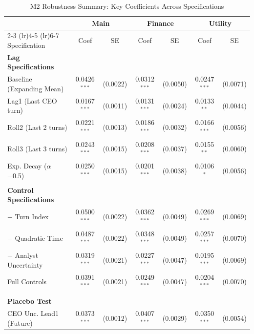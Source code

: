 \documentclass[11pt]{article}
\begin{document}
\newpage

\begin{table}[htbp]
\centering
\caption{M2 Robustness Summary: Key Coefficients Across Specifications}
\label{tab:robustness_summary}
\footnotesize
\setlength{\tabcolsep}{4pt}
\begin{tabular}{lcccccc}
\toprule
 & \multicolumn{2}{c}{Main} & \multicolumn{2}{c}{Finance} & \multicolumn{2}{c}{Utility} \\
\cmidrule(lr){2-3} \cmidrule(lr){4-5} \cmidrule(lr){6-7}
Specification & Coef & SE & Coef & SE & Coef & SE \\
\midrule
\textbf{Lag Specifications} \\
Baseline (Expanding Mean) & 0.0426$^{***}$ & (0.0022) & 0.0312$^{***}$ & (0.0050) & 0.0247$^{***}$ & (0.0071) \\
Lag1 (Last CEO turn) & 0.0167$^{***}$ & (0.0011) & 0.0131$^{***}$ & (0.0024) & 0.0133$^{**}$ & (0.0044) \\
Roll2 (Last 2 turns) & 0.0221$^{***}$ & (0.0013) & 0.0186$^{***}$ & (0.0032) & 0.0166$^{***}$ & (0.0056) \\
Roll3 (Last 3 turns) & 0.0243$^{***}$ & (0.0015) & 0.0208$^{***}$ & (0.0037) & 0.0155$^{**}$ & (0.0060) \\
Exp. Decay ($\alpha$=0.5) & 0.0250$^{***}$ & (0.0015) & 0.0201$^{***}$ & (0.0038) & 0.0106$^{*}$ & (0.0056) \\
 &  &  &  &  &  & \\
\textbf{Control Specifications} \\
+ Turn Index & 0.0500$^{***}$ & (0.0022) & 0.0362$^{***}$ & (0.0049) & 0.0269$^{***}$ & (0.0069) \\
+ Quadratic Time & 0.0487$^{***}$ & (0.0022) & 0.0348$^{***}$ & (0.0049) & 0.0257$^{***}$ & (0.0070) \\
+ Analyst Uncertainty & 0.0319$^{***}$ & (0.0021) & 0.0227$^{***}$ & (0.0047) & 0.0195$^{***}$ & (0.0069) \\
Full Controls & 0.0391$^{***}$ & (0.0021) & 0.0249$^{***}$ & (0.0047) & 0.0204$^{***}$ & (0.0070) \\
 &  &  &  &  &  & \\
\textbf{Placebo Test} \\
CEO Unc. Lead1 (Future) & 0.0373$^{***}$ & (0.0012) & 0.0407$^{***}$ & (0.0029) & 0.0350$^{***}$ & (0.0054) \\

\end{tabular}
\end{table}
\end{document}
